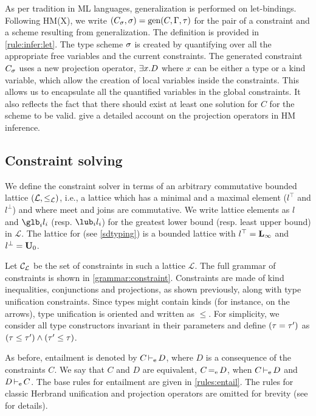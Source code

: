 As per tradition in ML languages, generalization is performed
on let-bindings.
Following HM(X), we write $(C_\sigma, \sigma) = \operatorname{\text{gen}}(C,\Gamma,\tau)$
for the pair of a constraint and a scheme resulting from
generalization. The definition is provided in \cref{rule:infer:let}.
The type scheme $\sigma$ is created by quantifying over all the appropriate
free variables and the current constraints.
The generated constraint $C_\sigma$ uses a new projection operator,
$\exists x.D$ where $x$ can be either a type or a kind variable, which
allow the creation of local variables inside the constraints.
This allows us to encapsulate all the quantified variables in the global constraints.
It also reflects the fact that there
should exist at least one solution for $C$ for the scheme to be valid.
\citet{DBLP:journals/tapos/OderskySW99} give a detailed account
on the projection operators in HM inference.


\subsection{Constraint solving}
\label{infer:solving}

\newcommand\A{\mathcal A}
\newcommand\SC{\mathcal S}

We define the constraint solver in terms of an arbitrary commutative bounded
lattice $(\mathcal L, \leq_\mathcal L)$, i.e.,
a lattice which has a minimal and a maximal element ($l^\top$ and $l^\bot$)
and where meet and joins are commutative.
We write lattice elements as $l$ and $\glb_i l_i$ (resp. $\lub_i l_i$)
for the greatest lower bound (resp. least upper bound) in $\mathcal L$.
The lattice for \lang (see \cref{sdtyping}) is a bounded lattice with
$l^\top = \mathbf{L}_\infty$ and $l^\bot = \mathbf{U}_0$.

Let ${\mathcal C_{\mathcal L}}$ be the set of constraints in such a lattice $\mathcal L$.
The full grammar of constraints is shown in \cref{grammar:constraint}.
Constraints are made of kind inequalities, conjunctions and
projections, as shown previously, along with type unification
constraints. Since types might contain kinds (for instance, on the arrows),
type unification is oriented and written as $\leq$.
For simplicity, we consider all type constructors
invariant in their parameters
and define $(\tau = \tau')$ as $(\tau \leq \tau') \wedge (\tau' \leq \tau)$.

As before, entailment is denoted by $C \operatorname{\vdash_e} D$,
where $D$ is a consequence of the constraints $C$.
We say that $C$ and $D$ are equivalent, $C \operatorname{=_e} D$,
when $C \operatorname{\vdash_e} D$ and $D \operatorname{\vdash_e} C$.
The base rules for entailment are given in \cref{rules:entail}.
The rules for classic Herbrand unification and
projection operators are omitted for brevity (see
\citep{DBLP:journals/tapos/OderskySW99} for
details).

